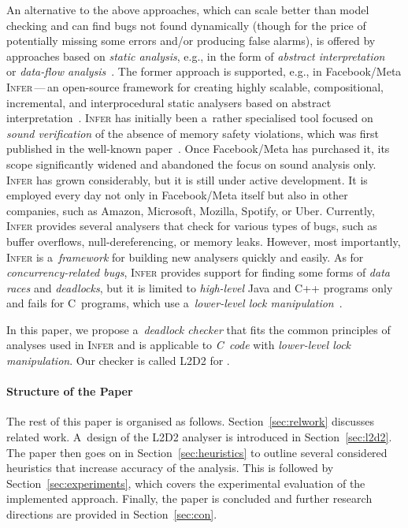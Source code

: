 \documentclass[runningheads]{llncs}
\begin{document}
An alternative to the above approaches, which can scale better than model
checking and can find bugs not found dynamically (though for the price of
potentially missing some errors and/or producing false alarms), is offered
by approaches based on \emph{static analysis}, e.g., in the form of
\emph{abstract interpretation}~\cite{ai77} or
\emph{data-flow analysis}~\cite{dfa73}. The former approach is supported,
e.g., in Facebook/Meta \textsc{Infer}\,---\,an open-source framework for
creating highly scalable, compositional, incremental, and interprocedural
static analysers based on abstract interpretation~\cite{inferNFM15}.
\textsc{Infer} has initially been a~rather specialised tool focused on
\emph{sound verification} of the absence of memory safety violations,
which was first published in the well-known paper~\cite{biabd09}. Once
Facebook/Meta has purchased it, its scope significantly widened and
abandoned the focus on sound analysis only. \textsc{Infer} has grown
considerably, but it is still under active development. It is employed
every day not only in Facebook/Meta itself but also in other companies,
such as Amazon, Microsoft, Mozilla, Spotify, or Uber. Currently,
\textsc{Infer} provides several analysers that check for various types
of bugs, such as buffer overflows, null-dereferencing, or memory leaks.
However, most importantly, \textsc{Infer} is a~\emph{framework} for
building new analysers quickly and easily. As for
\emph{concurrency-related bugs}, \textsc{Infer} provides support for
finding some forms of \emph{data races} and \emph{deadlocks}, but it is
limited to \emph{high-level} Java and C++ programs only and fails for
C~programs, which use a~\emph{lower-level lock
manipulation}~\cite{racerD18,inferCACM19}.

In this paper, we propose a~\emph{deadlock checker} that fits the common
principles of analyses used in \textsc{Infer} and is applicable to
\emph{C~code} with \emph{lower-level lock manipulation}. Our checker is
called \textsc{L2D2} for .

\paragraph{Structure of the Paper}
The rest of this paper is organised as follows. Section~\ref{sec:relwork}
discusses related work. A~design of the \textsc{L2D2} analyser is
introduced in Section~\ref{sec:l2d2}. The paper then goes on in
Section~\ref{sec:heuristics} to outline several considered heuristics that
increase accuracy of the analysis. This is followed by
Section~\ref{sec:experiments}, which covers the experimental evaluation of
the implemented approach. Finally, the paper is concluded and further
research directions are provided in Section~\ref{sec:con}.
\end{document}
